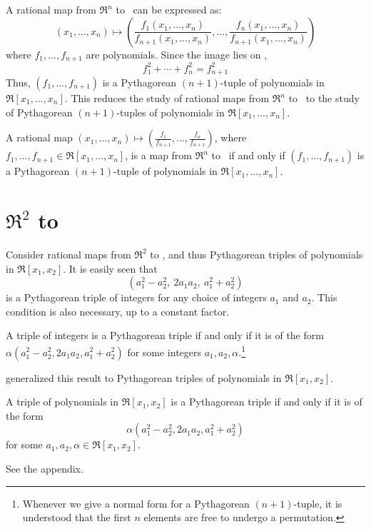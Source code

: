
A rational map from $\Re^n$ to \ can be expressed as:
\[
	(x_1,\ldots,x_n) \mapsto
	(\frac{f_1(x_1,\ldots,x_n)}{f_{n+1}(x_1,\ldots,x_n)}, \ldots,
	 \frac{f_n(x_1,\ldots,x_n)}{f_{n+1}(x_1,\ldots,x_n)})
\]
where $f_1,\ldots,f_{n+1}$ are polynomials.
Since the image lies on ,
\[
	f_1^2 + \cdots + f_n^2 = f_{n+1}^2
\]
Thus, $(f_1,\ldots,f_{n+1})$ is a Pythagorean $(n+1)$-tuple of polynomials in
$\Re[x_1,\ldots,x_n]$.
This reduces the study of rational maps from $\Re^{n}$ to \ 
to the study of Pythagorean $(n+1)$-tuples of polynomials in 
$\Re[x_1,\ldots,x_n]$.

\begin{lemma}
\label{lem:iffpyth}
A rational map 
$(x_1,\ldots,x_n) \mapsto (\frac{f_1}{f_{n+1}},\ldots,\frac{f_n}{f_{n+1}})$,
where $f_1,\ldots,f_{n+1} \in \Re[x_1,\ldots,x_n]$, is a map from $\Re^n$
to \Sn{n-1}\ if and only if $(f_1,\ldots,f_{n+1})$ is a Pythagorean
$(n+1)$-tuple of polynomials in $\Re[x_1,\ldots,x_n]$.
\end{lemma}

\section{$\Re^{2}$ to }
\label{sec:n2}

Consider rational maps from $\Re^2$ to ,
and thus Pythagorean triples of polynomials in $\Re[x_1,x_2]$.
It is easily seen that 
\[ (a_1^2 - a_2^2,\ 2a_1a_2,\ a_1^2 + a_2^2)
\]
is a Pythagorean triple
of integers for any choice of integers $a_1$ and $a_2$.
This condition is also necessary, up to a constant factor.
%
\begin{lemma}[Classical]
\label{lem:classical}
A triple of integers is a Pythagorean triple if and only if
it is of the form $\alpha(a_1^2 - a_2^2, 2a_1a_2, a_1^2 + a_2^2)$ 
for some integers $a_1,a_2,\alpha$.\footnote{Whenever
	we give a normal form for a Pythagorean $(n+1)$-tuple,
	it is understood that the first $n$ elements are free to undergo
	a permutation.}
\end{lemma}
%
\cite{kubota72} generalized this result
to Pythagorean triples of polynomials in $\Re[x_1,x_2]$.
%
\begin{lemma}[Kubota 1972]
\label{lem:kubota}
A triple of polynomials in $\Re[x_1,x_2]$ is a Pythagorean triple 
if and only if it is of the form 
\begin{equation}
\label{eq:triple}
	\alpha(a_1^2 - a_2^2, 2a_1a_2, a_1^2 + a_2^2)
\end{equation}
for some $a_1,a_2,\alpha \in \Re[x_1,x_2]$.
\end{lemma}
\prf
See the appendix.
\QED

